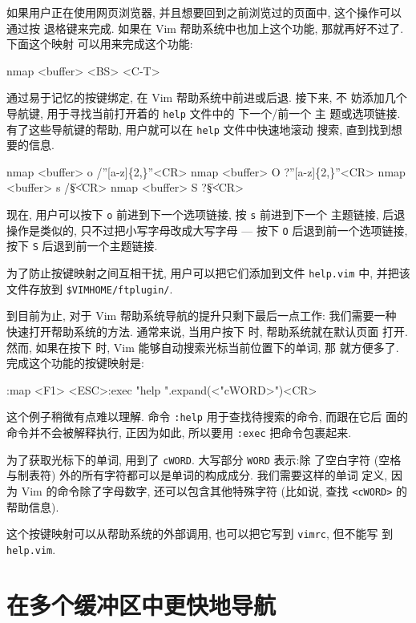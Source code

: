 如果用户正在使用网页浏览器, 并且想要回到之前浏览过的页面中, 这个操作可以通过按
退格键来完成. 如果在 Vim 帮助系统中也加上这个功能, 那就再好不过了. 下面这个映射
可以用来完成这个功能:
\begin{vimcode}
nmap <buffer> <BS> <C-T>
\end{vimcode}

通过易于记忆的按键绑定, 在 Vim 帮助系统中前进或后退. 接下来, 不
妨添加几个导航键, 用于寻找当前打开着的 \texttt{help} 文件中的 下一个/前一个 主
题或选项链接. 有了这些导航键的帮助, 用户就可以在 \texttt{help} 文件中快速地滚动
搜索, 直到找到想要的信息.
\begin{vimcode}
nmap <buffer> o /''[a-z]\{2,\}''<CR>
nmap <buffer> O ?''[a-z]\{2,\}''<CR>
nmap <buffer> s /\|\S\+\|<CR>
nmap <buffer> S ?\|\S\+\|<CR>
\end{vimcode}

现在, 用户可以按下 \texttt{o} 前进到下一个选项链接, 按 \texttt{s} 前进到下一个
主题链接, 后退操作是类似的, 只不过把小写字母改成大写字母 --- 按下 \texttt{O}
后退到前一个选项链接, 按下 \texttt{S} 后退到前一个主题链接.

\begin{warning}
    为了防止按键映射之间互相干扰, 用户可以把它们添加到文件 \texttt{help.vim} 中,
    并把该文件存放到 \verb'$VIMHOME/ftplugin/'.
\end{warning}

到目前为止, 对于 Vim 帮助系统导航的提升只剩下最后一点工作: 我们需要一种
快速打开帮助系统的方法. 通常来说, 当用户按下  时, 帮助系统就在默认页面
打开. 然而, 如果在按下  时, Vim 能够自动搜索光标当前位置下的单词, 那
就方便多了. 完成这个功能的按键映射是:
\begin{vimcode}
:map <F1> <ESC>:exec "help ".expand(<"cWORD>")<CR>
\end{vimcode}
这个例子稍微有点难以理解. 命令 \texttt{:help} 用于查找待搜索的命令, 而跟在它后
面的命令并不会被解释执行, 正因为如此, 所以要用 \texttt{:exec} 把命令包裹起来.

为了获取光标下的单词, 用到了 \texttt{cWORD}. 大写部分 \texttt{WORD} 表示:除
了空白字符 (空格与制表符) 外的所有字符都可以是单词的构成成分. 我们需要这样的单词
定义, 因为 Vim 的命令除了字母数字, 还可以包含其他特殊字符 (比如说, 查找
\texttt{<cWORD>} 的帮助信息).

这个按键映射可以从帮助系统的外部调用, 也可以把它写到 \texttt{vimrc}, 但不能写
到 \texttt{help.vim}.

\section{在多个缓冲区中更快地导航}
\label{sec:faster_navigation_in_multiple_buffers}


